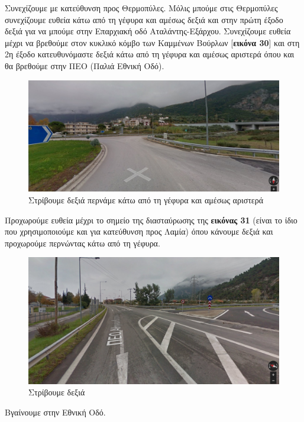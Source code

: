 Συνεχίζουμε με κατεύθυνση προς Θερμοπύλες. Μόλις μπούμε στις Θερμοπύλες συνεχίζουμε ευθεία κάτω από τη γέφυρα και αμέσως δεξιά και στην πρώτη έξοδο δεξιά για να μπούμε στην Επαρχιακή οδό Αταλάντης-Εξάρχου. Συνεχίζουμε ευθεία μέχρι να βρεθούμε στον κυκλικό κόμβο των Καμμένων Βούρλων [\textbf{εικόνα 30}] και στη 2η έξοδο κατευθυνόμαστε δεξιά κάτω από τη γέφυρα και αμέσως αριστερά όπου και θα βρεθούμε στην ΠΕΟ (Παλιά Εθνική Οδό).
\begin{figure}[H]
\includegraphics[width=\textwidth]{images/lamia-athina/lamia/lamia_006.jpg}
\caption{Στρίβουμε δεξιά περνάμε κάτω από τη γέφυρα και αμέσως αριστερά}  
\end{figure}

Προχωρούμε ευθεία μέχρι το σημείο της διασταύρωσης της \textbf{εικόνας 31} (είναι το ίδιο που χρησιμοποιούμε και για κατεύθυνση προς Λαμία) όπου κάνουμε δεξιά και προχωρούμε περνώντας κάτω από τη γέφυρα. 
\begin{figure}[H]
\includegraphics[width=\textwidth]{images/lamia-athina/lamia/lamia_007.jpg}
\caption{Στρίβουμε δεξιά} 
\end{figure}


Βγαίνουμε στην Εθνική Οδό.

